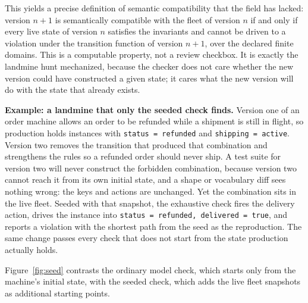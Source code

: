 \documentclass[11pt]{article}
\newenvironment{example}[1][Example]%
  {\par\smallskip\begin{leftbar}\noindent\textbf{#1.}\enspace}%
  {\end{leftbar}\par\smallskip}
\newcommand{\code}[1]{\texttt{#1}}
\begin{document}
This yields a precise definition of semantic compatibility that the field has
lacked: version $n{+}1$ is semantically compatible with the fleet of version
$n$ if and only if every live state of version $n$ satisfies the invariants and
cannot be driven to a violation under the transition function of version
$n{+}1$, over the declared finite domains. This is a computable property, not a
review checkbox. It is exactly the landmine hunt mechanized, because the checker
does not care whether the new version could have constructed a given state; it
cares what the new version will do with the state that already exists.

\begin{example}[Example: a landmine that only the seeded check finds]
Version one of an order machine allows an order to be refunded while a shipment
is still in flight, so production holds instances with
\code{status = refunded} and \code{shipping = active}. Version two removes the
transition that produced that combination and strengthens the rules so a
refunded order should never ship. A test suite for version two will never
construct the forbidden combination, because version two cannot reach it from
its own initial state, and a shape or vocabulary diff sees nothing wrong: the
keys and actions are unchanged. Yet the combination sits in the live fleet.
Seeded with that snapshot, the exhaustive check fires the delivery action, drives
the instance into \code{status = refunded, delivered = true}, and reports a
violation with the shortest path from the seed as the reproduction. The same
change passes every check that does not start from the state production actually
holds.
\end{example}

Figure~\ref{fig:seed} contrasts the ordinary model check, which starts only from
the machine's initial state, with the seeded check, which adds the live fleet
snapshots as additional starting points.
\end{document}
